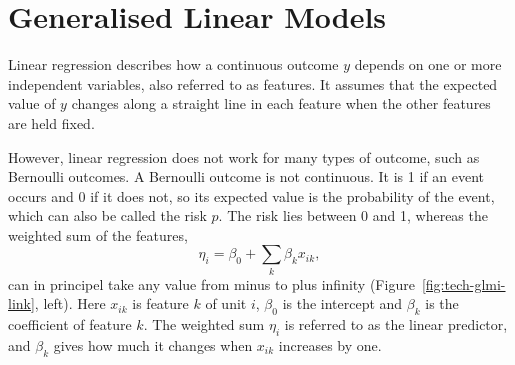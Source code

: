 %

\section{Generalised Linear Models}
\label{sec:tech-glmi}
\label{sec:tech-model}

Linear regression describes how a continuous outcome $y$ depends on one or more independent
variables, also referred to as features. It assumes that the expected value of $y$ changes along a
straight line in each feature when the other features are held fixed.

However, linear regression does not work for many types of outcome, such as Bernoulli outcomes. A
Bernoulli outcome is not continuous. It is 1 if an event occurs and 0 if it does not, so its expected
value is the probability of the event, which can also be called the risk $p$. The risk lies between 0 and 1,
whereas the weighted sum of the features,
\begin{equation}
  \eta_i = \beta_0 + \sum_k \beta_k x_{ik},
  \label{eq:tech-lp}
\end{equation}
can in principel take any value from minus to plus infinity (Figure~\ref{fig:tech-glmi-link}, left). Here $x_{ik}$
is feature $k$ of unit $i$, $\beta_0$ is the intercept and $\beta_k$ is the coefficient of feature
$k$. The weighted sum $\eta_i$ is referred to as the linear predictor, and $\beta_k$ gives how much it
changes when $x_{ik}$ increases by one.

